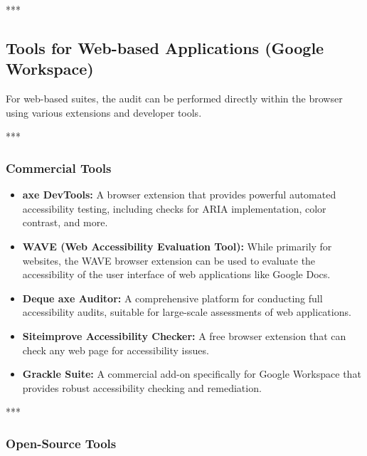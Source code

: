 ***

\subsection{Tools for Web-based Applications (Google Workspace)}
\label{sub:tools-for-web-based-applications-google-workspace}

For web-based suites, the audit can be performed directly within the browser using various extensions and developer tools.

***

\subsubsection{Commercial Tools}
\label{sub:commercial-tools-1}

\begin{itemize}
	\item \textbf{axe DevTools\supercite{AxeDevTools}:} A browser extension that provides powerful automated accessibility testing, including checks for \gls{ARIA} implementation, color contrast, and more.
	\item \textbf{WAVE (Web Accessibility Evaluation Tool)\supercite{WAVE}:} While primarily for websites, the WAVE browser extension can be used to evaluate the accessibility of the user interface of web applications like Google Docs.
	\item \textbf{Deque axe Auditor\supercite{DequeWorldSpace}:} A comprehensive platform for conducting full accessibility audits, suitable for large-scale assessments of web applications.
	\item \textbf{Siteimprove Accessibility Checker\supercite{SiteimproveAccessibility}:} A free browser extension that can check any web page for accessibility issues.
	\item \textbf{Grackle Suite\supercite{GrackleDocs}:} A commercial add-on specifically for Google Workspace that provides robust accessibility checking and remediation.
\end{itemize}

***

\subsubsection{Open-Source Tools}
\label{sub:open-source-tools-1}

